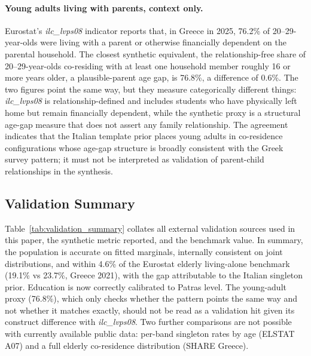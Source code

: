 \documentclass{article}
\begin{document}
\paragraph{Young adults living with parents, context only.}
Eurostat's \textit{ilc\_lvps08} indicator \citep{Eurostat2025ilc_lvps08} reports that, in Greece in 2025, 76.2\% of 20--29-year-olds were living with a parent or otherwise financially dependent on the parental household. The closest synthetic equivalent, the relationship-free share of 20--29-year-olds co-residing with at least one household member roughly 16 or more years older, a plausible-parent age gap, is 76.8\%, a difference of 0.6\%. The two figures point the same way, but they measure categorically different things: \textit{ilc\_lvps08} is relationship-defined and includes students who have physically left home but remain financially dependent, while the synthetic proxy is a structural age-gap measure that does not assert any family relationship. The agreement indicates that the Italian template prior places young adults in co-residence configurations whose age-gap structure is broadly consistent with the Greek survey pattern; it must not be interpreted as validation of parent-child relationships in the synthesis.

\subsection{Validation Summary}\label{validation-summary}

Table~\ref{tab:validation_summary} collates all external validation sources used in this paper, the synthetic metric reported, and the benchmark value. In summary, the population is accurate on fitted marginals, internally consistent on joint distributions, and within 4.6\% of the Eurostat elderly living-alone benchmark (19.1\% vs 23.7\%, Greece 2021), with the gap attributable to the Italian singleton prior. Education is now correctly calibrated to Patras level. The young-adult proxy (76.8\%), which only checks whether the pattern points the same way and not whether it matches exactly, should not be read as a validation hit given its construct difference with \textit{ilc\_lvps08}. Two further comparisons are not possible with currently available public data: per-band singleton rates by age (ELSTAT A07) and a full elderly co-residence distribution (SHARE Greece).
\end{document}
